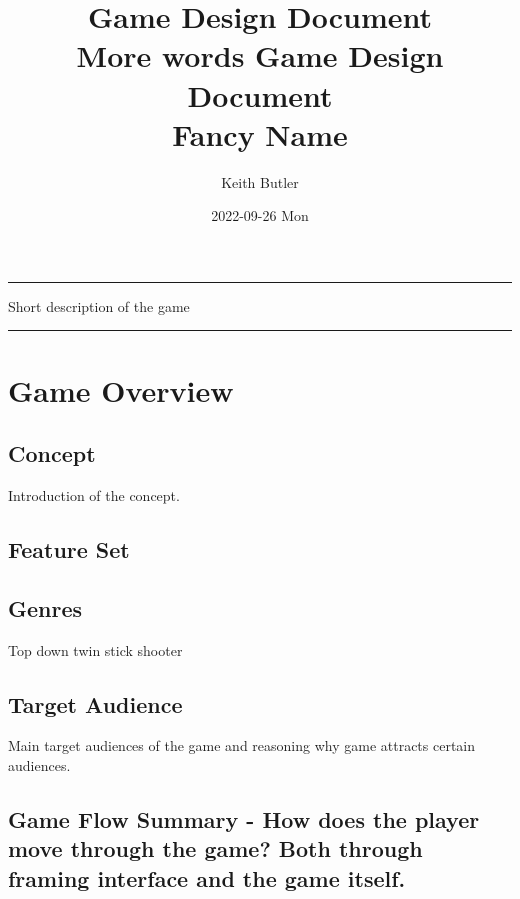 \documentclass[article, 11pt]{article}
\author{Keith Butler}
\date{2022-09-26 Mon}
\title{Game Design Document\\\medskip
\large More words}
\begin{document}
\newcommand{\gameName}{Fancy Name}
\newcommand{\shortDescription}{Short description of the game}

\begin{titlepage}
\begin{center}
\title {
    Game Design Document
    \\
    \vspace{7cm}
    {\huge \gameName}
}

\maketitle
\nopar\noindent\rule{\textwidth}{0.4pt}
\begin{center}\shortDescription\end{center}
\nopar\noindent\rule{\textwidth}{0.4pt}
\vspace{15mm}

\end{center}
\end{titlepage}

\tableofcontents

\section{Game Overview}
\label{sec:org28b3e93}
\subsection{Concept}
\label{sec:orgf00c6ca}

Introduction of the concept.
\subsection{Feature Set}
\label{sec:org8b4b075}
\subsection{Genres}
\label{sec:org5731449}
Top down twin stick shooter
\subsection{Target Audience}
\label{sec:orgc224b84}

Main target audiences of the game and reasoning why game attracts certain audiences.
\subsection{Game Flow Summary - How does the player move through the game? Both through framing interface and the game itself.}
\label{sec:orgeb3b559}
\end{document}
